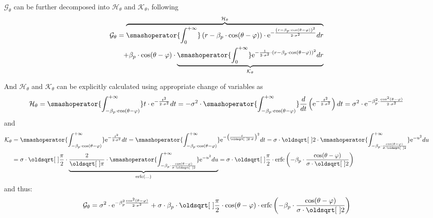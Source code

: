 $\mathcal{G}_\theta$ can be further decomposed into $\mathcal{H_\theta}$ and $\mathcal{K_\theta}$, following
\begin{equation}
	\begin{aligned}
		\mathcal{G}_\theta &= \overbrace{\smashoperator{\int_{0}^{+\infty}} \left(r-\beta_p\cdot\cos(\theta - \varphi)\right)\cdot \e^{-\frac{\left(r-\beta_p\cdot\cos(\theta - \varphi)\right)^2}{2 \cdot \sigma^2}} dr}^{\mathcal{H_\theta}}\\
		& \pushright{+ \beta_p \cdot \cos(\theta - \varphi)\cdot \underbrace{\smashoperator{\int_{0}^{+\infty}} \e^{-\frac{1}{2 \cdot \sigma^2}\cdot \left(r-\beta_p\cdot\cos(\theta - \varphi)\right)^2} dr}_{\mathcal{K_\theta}}}
	\end{aligned}
\end{equation}

And $\mathcal{H_\theta}$ and $\mathcal{K_\theta}$ can be explicitly calculated using appropriate change of variables as
\begin{equation}
	\mathcal{H_\theta} = \smashoperator{\int_{-\beta_p \cdot \cos(\theta - \varphi)}^{+\infty}} t\cdot \e^{-\frac{t^2}{2 \cdot \sigma^2}} dt = -\sigma^2\cdot \smashoperator{\int_{-\beta_p \cdot \cos(\theta - \varphi)}^{+\infty}}  \frac{d}{dt}\left(\e^{-\frac{t^2}{2 \cdot \sigma^2}}\right) dt = \sigma^2 \cdot \e^{- \beta_p^2 \cdot\frac{\cos^2(\theta - \varphi)}{2 \cdot \sigma^2}}
\end{equation}
and
\begin{equation}
	\begin{aligned}
		\mathcal{K_\theta} &= \smashoperator{\int_{-\beta_p \cdot \cos(\theta - \varphi)}^{+\infty}} \e^{-\frac{t^2}{2 \cdot \sigma^2}} dt = \smashoperator{\int_{-\beta_p \cdot \cos(\theta - \varphi)}^{+\infty}} \e^{-\left(\frac{t}{\sqrt{2} \cdot \sigma}\right)^2} dt =\sigma \cdot \sqrt{2} \cdot \smashoperator{\int_{-\beta_p \cdot \frac{\cos(\theta - \varphi)}{\sigma \cdot \sqrt{2}}}^{+\infty}} \e^{-u^2} du\\
		& = \sigma \cdot \sqrt{\frac{\pi}{2}} \cdot \underbrace{\frac{2}{\sqrt{\pi}} \cdot \smashoperator{\int_{-\beta_p \cdot\frac{\cos(\theta - \varphi)}{\sigma \cdot \sqrt{2}}}^{+\infty}} \e^{-u^2} du}_{\erfc(...)} = \sigma \cdot \sqrt{\frac{\pi}{2}} \cdot \erfc\left(-\beta_p \cdot \frac{\cos(\theta - \varphi)}{\sigma \cdot \sqrt{2}}\right)
	\end{aligned}
\end{equation}
and thus:
\begin{equation}
	\mathcal{G}_\theta = \sigma^2 \cdot \e^{-\beta_p^2\frac{\cos^2(\theta - \varphi)}{2 \cdot \sigma^2}} + \sigma \cdot \beta_p \cdot \sqrt{\frac{\pi}{2}} \cdot \cos(\theta-\varphi) \cdot \erfc\left(-\beta_p\cdot\frac{\cos(\theta - \varphi)}{\sigma \cdot \sqrt{2}}\right)
\end{equation}

